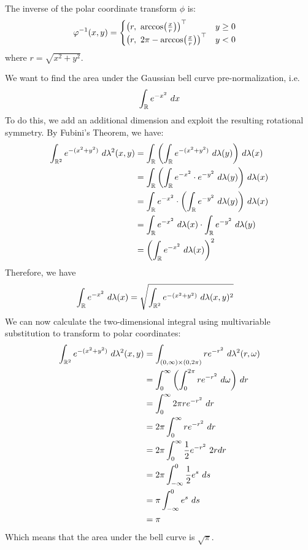 \begin{proposition}
	The inverse of the polar coordinate transform $\phi$ is:
	\begin{align*}
		\varphi^{-1}(x,y) 
		&=
		\begin{cases}
			\qty(r, ~\arccos(\frac{x}{r}))^\top & y \geq 0\\
			\qty(r, ~2\pi - \arccos(\frac{x}{r}))^\top & y < 0
		\end{cases}
	\end{align*}
	where $r = \sqrt{x^2 + y^2}$.
\end{proposition}
\pagebreak
\begin{example}
	We want to find the area under the Gaussian bell curve pre-normalization, i.e.
	\begin{align*}
		\int_{\mathbb{R}} e^{-x^2} ~dx
	\end{align*}
	To do this, we add an additional dimension and exploit the resulting rotational symmetry.
	By Fubini's Theorem, we have:
	\begin{align*}
		\int_{\mathbb{R}^2} e^{-(x^2 + y^2)} ~d\lambda^2(x,y)
		&=
		\int_{\mathbb{R}} \qty(\int_{\mathbb{R}} e^{-(x^2 + y^2)} ~d\lambda(y)) ~d\lambda(x)\\
		&=
		\int_{\mathbb{R}} \qty(\int_{\mathbb{R}} e^{-x^2} \cdot e^{-y^2} ~d\lambda(y)) ~d\lambda(x)\\
		&=
		\int_{\mathbb{R}} e^{-x^2} \cdot \qty(\int_{\mathbb{R}} e^{-y^2} ~d\lambda(y)) ~d\lambda(x)\\
		&= \int_{\mathbb{R}} e^{-x^2} ~d\lambda(x) \cdot \int_{\mathbb{R}} e^{-y^2} ~d\lambda(y)\\
		&= \qty(\int_{\mathbb{R}} e^{-x^2} ~d\lambda(x))^2
	\end{align*}
	Therefore, we have
	\begin{align*}
		\int_{\mathbb{R}} e^{-x^2} ~d\lambda(x) &= \sqrt{\int_{\mathbb{R}^2} e^{-(x^2 + y^2)} ~d\lambda(x,y)^2}
	\end{align*}
	We can now calculate the two-dimensional integral using multivariable substitution to transform to polar coordinates:
	\begin{align*}
		\int_{\mathbb{R}^2} e^{-(x^2 + y^2)} ~d\lambda^2(x,y)
		&= \int_{(0,\infty) \times (0,2\pi)} re^{-r^2}  ~d\lambda^2(r,\omega)\\
		&= \int_0^\infty \qty(\int_{0}^{2\pi} re^{-r^2} ~d\omega) ~dr\\
		&= \int_0^\infty 2\pi re^{-r^2} ~dr\\
		&= 2\pi \int_0^\infty re^{-r^2} ~dr\\
		&= 2\pi \int_0^\infty \frac{1}{2}e^{-r^2} ~2rdr\\
		&= 2\pi \int_{-\infty}^0 \frac{1}{2} e^{s} ~ds\\
		&= \pi \int_{-\infty}^0 e^{s} ~ds\\
		&= \pi
	\end{align*}
	Which means that the area under the bell curve is $\sqrt{\pi}$.
\end{example}
